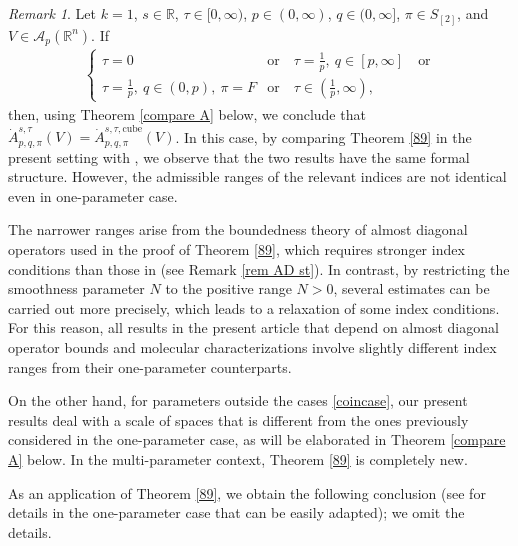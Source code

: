 \documentclass[11pt, reqno]{amsart}
\theoremstyle{definition}
\theoremstyle{remark}
\newtheorem{remark}[theorem]{Remark}
\numberwithin{equation}{section}
\newcommand{\R}{\mathbb R}
\begin{document}
\begin{remark}\label{open vs D2}
Let $k=1$, $s\in\R$, $\tau\in[0,\infty)$, $p\in(0,\infty)$, $q\in(0,\infty]$,
$\pi\in S_{[2]}$, and $V\in\mathscr A_p(\R^n)$. If
\begin{equation}\label{coincase}
\begin{split}
\begin{cases}
    \tau=0 & \text{or}\quad \tau=\frac1p,\ q\in[p,\infty]\quad \text{or}\\
    \tau=\frac1p,\ q\in(0,p),\ \pi=F & \text{or}\quad \tau\in(\frac1p,\infty),
    \end{cases}
\end{split}
\end{equation}
then, using Theorem \ref{compare A} below, we conclude that $\dot A^{s,\tau}_{p,q,\pi}(V)
= \dot A^{s,\tau,\mathrm{cube}}_{p,q,\pi}(V)$.
In this case, by comparing Theorem \ref{89} in the present setting with
\cite[Theorem 3.17]{BHYY:1c}, we observe that the two results have
the same formal structure.
However, the admissible ranges of the relevant indices are not identical even in one-parameter case.

The narrower ranges arise from the boundedness theory of almost
diagonal operators used in the proof of Theorem \ref{89},
which requires stronger index
conditions than those in \cite{BHYY:1c} (see Remark \ref{rem AD st}).
In contrast, by restricting the smoothness parameter $N$
to the positive range $N>0$, several estimates can be carried out
more precisely, which leads to a relaxation of some index conditions.
For this reason, all results in the present article that depend
on almost diagonal operator bounds and molecular characterizations
involve slightly different index ranges from their one-parameter
counterparts.

On the other hand, for parameters outside the cases \eqref{coincase},
our present results deal with a scale of spaces that is different from the ones previously considered in the one-parameter case, as will be elaborated in Theorem \ref{compare A} below.
In the multi-parameter context, Theorem \ref{89} is completely new.
\end{remark}

As an application of Theorem \ref{89},
we obtain the following conclusion (see \cite[Proposition 3.18]{BHYY:1c} for details in the one-parameter case that can be easily adapted); we omit the details.
\end{document}
